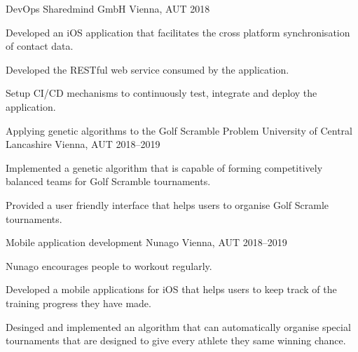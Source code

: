 

\begin{cventries}

\cventry
{DevOps} %
{Sharedmind GmbH} %
{Vienna, AUT} %
{2018} %
{
	\begin{cvitems} %
		\item {Developed an iOS application that facilitates the cross platform synchronisation of contact data.}
		\item {Developed the RESTful web service consumed by the application.}
		\item {Setup CI/CD mechanisms to continuously test, integrate and deploy the application.}
	\end{cvitems}
}
\cventry
{Applying genetic algorithms to the Golf Scramble Problem} %
{University of Central Lancashire} %
{Vienna, AUT} %
{2018--2019} %
{
	\begin{cvitems} %
		\item {Implemented a genetic algorithm that is capable of forming competitively balanced teams for Golf Scramble tournaments.}
		\item {Provided a user friendly interface that helps users to organise Golf Scramle tournaments.}
	\end{cvitems}
 }
\bigskip
\cventry
{Mobile application development} %
{Nunago} %
{Vienna, AUT} %
{2018--2019} %
{
	\begin{cvitems} %
		\item {Nunago encourages people to workout regularly.}
		\item {Developed a mobile applications for iOS that helps users to keep track of the training progress they have made.}
		\item {Desinged and implemented an algorithm that can automatically organise special tournaments that are designed to give every athlete they same winning chance.}

\end{cvitems}}
\end{cventries}
